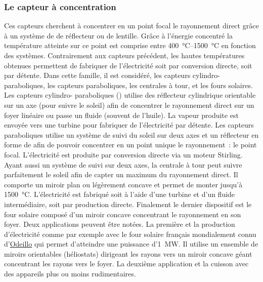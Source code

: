 \subsubsection{Le capteur à concentration} %
\label{ssub:le_capteur_a_concentration}
Ces capteurs cherchent à concentrer en un point focal le rayonnement direct grâce à un
système de de réflecteur ou de lentille. Grâce à l’énergie concentré la température
atteinte sur ce point est comprise entre \SIrange{400}{1500}{\celsius} en fonction des
systèmes. Contrairement aux capteurs précédent, les hautes températures obtenues
permettent de fabriquer de l’électricité soit par conversion directe, soit par détente.
Dans cette famille, il est considéré, les capteurs cylindro-paraboliques, les capteurs
paraboliques, les centrales à tour, et les fours solaires. Les capteurs cylindro-
paraboliques () utilise des réflecteur
cylindrique orientable sur un axe (pour suivre le soleil) afin de concentrer le
rayonnement direct sur un foyer linéaire ou passe un fluide (souvent de l’huile). La
vapeur produite est envoyée vers une turbine pour fabriquer de l’électricité par détente.
Les capteurs paraboliques utilise un système de suivi du soleil sur deux axes et un
réflecteur en forme de  afin de pouvoir concentrer en un point unique le rayonnement~: le point focal.
L’électricité est produite par conversion directe via un moteur Stirling. Ayant aussi un
système de suivi sur deux axes, la centrale à tour peut suivre parfaitement le soleil afin
de capter un maximum du rayonnement direct. Il comporte un miroir plan ou légèrement
concave et permet de monter jusqu’à \SI{1500}{\celsius}. L’électricité est fabriqué soit à
l’aide d’une turbine et d’un fluide intermédiaire, soit par production directe. Finalement
le dernier dispositif est le four solaire composé d’un miroir concave concentrant le
rayonnement en son foyer. Deux applications peuvent être notées. La première et la
production d’électricité comme par exemple avec le four solaire français mondialement
connu d’\href{http://www.promes.cnrs.fr/index.php?page=historique}{Odeillo} qui permet
d’atteindre une puissance d’\SI{1}{\mega\watt}. Il utilise un ensemble de miroirs
orientables (héliostats) dirigeant les rayons vers un miroir concave géant concentrant les
rayons vers le foyer. La deuxième application et la cuisson avec des appareils plus ou
moins rudimentaires.


